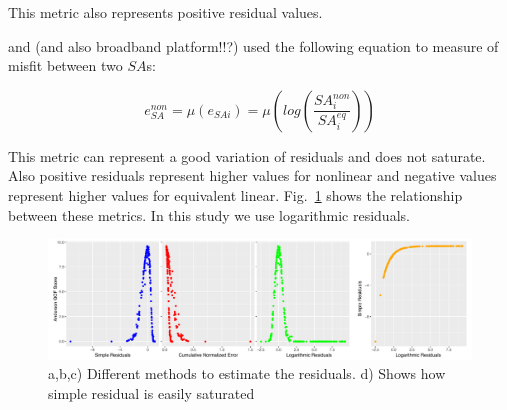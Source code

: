 This metric also represents positive residual values. 

\citet{Assimaki2012} and \citet{Carlton2016comparison} (and also broadband platform!!?) used the following equation to measure of misfit between two $SA$s:

\begin{equation}
e_{SA}^{non}=\mu(e_{SAi})=\mu(log(\frac{SA_{i}^{non}}{SA_{i}^{eq}}))
\end{equation}

This metric can represent a good variation of residuals and does not saturate. Also positive residuals represent higher values for nonlinear and negative values represent higher values for equivalent linear. Fig.~\ref{fig:response_spectra_sensitivity} shows the relationship between these metrics. In this study we use logarithmic residuals. 


\begin{figure}[H]
    \centering
    \includegraphics[width=\textwidth]{figures/pdf/response_spectra_sensitivity.pdf}
    \caption{a,b,c) Different methods to estimate the residuals. d) Shows how simple residual is easily saturated}
    \label{fig:response_spectra_sensitivity}
\end{figure}


